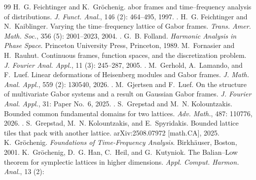 \documentclass[11pt,reqno]{amsart}
\numberwithin{equation}{section}
\theoremstyle{definition}
\theoremstyle{remark}
\begin{document}
\begin{thebibliography}{99}
H.~G. Feichtinger and K.~Gr\"ochenig.
abor frames and time--frequency analysis of distributions.
\newblock \emph{J. Funct. Anal.}, 146 (2): 464--495, 1997.
\newblock {}.
H.~G. Feichtinger and N.~Kaiblinger.
\newblock Varying the time--frequency lattice of {G}abor frames.
\newblock \emph{Trans. Amer. Math. Soc.}, 356 (5):
  2001--2023, 2004.
\newblock {}.
G.~B. Folland.
\newblock \emph{Harmonic Analysis in Phase Space}.
\newblock Princeton University Press, Princeton, 1989.
M.~Fornasier and H.~Rauhut.
\newblock Continuous frames, function spaces, and the discretization problem.
\newblock \emph{J. Fourier Anal. Appl.}, 11 (3): 245--287, 2005.
\newblock {}.
M.~Gerhold, A.~Lamando, and F.~Luef.
\newblock Linear deformations of {H}eisenberg modules and {G}abor frames.
\newblock \emph{J. Math. Anal. Appl.}, 559 (2): 130540, 2026.
\newblock {}.
M.~Gjertsen and F.~Luef.
\newblock On the structure of multivariate {G}abor systems and a result on
  {G}aussian {G}abor frames.
\newblock \emph{J. Fourier Anal. Appl.}, 31: Paper No.~6, 2025.
\newblock {}.
S.~Grepstad and M.~N. Kolountzakis.
\newblock Bounded common fundamental domains for two lattices.
\newblock \emph{Adv. Math.}, 487: 110776, 2026.
\newblock {}.
S.~Grepstad, M.~N. Kolountzakis, and E.~Spyridakis.
\newblock Bounded lattice tiles that pack with another lattice.
\newblock arXiv:2508.07972 [math.CA], 2025.
K.~Gr\"ochenig.
\newblock \emph{Foundations of Time-Frequency Analysis}.
\newblock Birkh\"auser, Boston, 2001.
K.~Gr\"ochenig, D.~G. Han, C.~Heil, and G.~Kutyniok.
\newblock The {B}alian--{L}ow theorem for symplectic lattices in higher
  dimensions.
\newblock \emph{Appl. Comput. Harmon. Anal.}, 13 (2):

\end{thebibliography}
\end{document}
